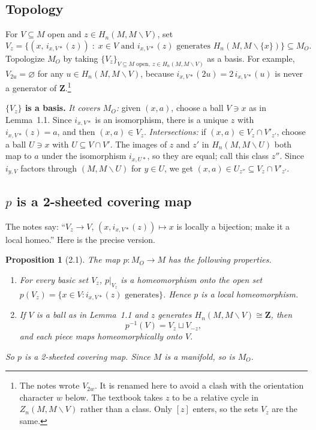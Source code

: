 \documentclass[11pt]{article}
\newcommand{\Z}{\mathbf{Z}}
\newcommand{\MO}{M_O}
\newcommand{\minus}{\smallsetminus}
\newcommand{\iso}{\cong}
\theoremstyle{namedit}
\newtheorem{prop}{Proposition}
\theoremstyle{namedrm}
\begin{document}
\subsection{Topology}
For $V\subseteq M$ open and $z\in H_n(M,M\minus V)$, set
\[
  V_z=\bigl\{(x,\,i_{x,V*}(z))\;:\;x\in V \text{ and } i_{x,V*}(z)\text{ generates }H_n(M,M\minus\{x\})\bigr\}
  \subseteq \MO .
\]
Topologize $\MO$ by taking $\{V_z\}_{V\subseteq M\text{ open},\ z\in H_n(M,M\minus V)}$ as a basis.
For example, $V_{2u}=\varnothing$ for any $u\in H_n(M,M\minus V)$, because $i_{x,V*}(2u)=2\,i_{x,V*}(u)$ is
never a generator of $\Z$.\footnote{The notes wrote $V_{2w}$. It is renamed here to avoid a clash with
the orientation character $w$ below. The textbook takes $z$ to be a relative cycle in
$Z_n(M,M\minus V)$ rather than a class. Only $[z]$ enters, so the sets $V_z$ are the same.}

\begin{filled}
\textbf{$\{V_z\}$ is a basis.}
\emph{It covers $\MO$:} given $(x,a)$, choose a ball $V\ni x$ as in Lemma~1.1. Since
$i_{x,V*}$ is an isomorphism, there is a unique $z$ with $i_{x,V*}(z)=a$, and then $(x,a)\in V_z$.
\emph{Intersections:} if $(x,a)\in V_z\cap V'_{z'}$, choose a ball $U\ni x$ with $U\subseteq V\cap V'$.
The images of $z$ and $z'$ in $H_n(M,M\minus U)$ both map to $a$ under the isomorphism $i_{x,U*}$, so
they are equal; call this class $z''$. Since $i_{y,V}$ factors through $(M,M\minus U)$ for $y\in U$, we
get $(x,a)\in U_{z''}\subseteq V_z\cap V'_{z'}$.
\end{filled}

\subsection{\texorpdfstring{$p$}{p} is a 2-sheeted covering map}
The notes say: ``$V_z\to V$, $(x,i_{x,V*}(z))\mapsto x$ is locally a bijection; make it a local homeo.''
Here is the precise version.

\begin{prop}[2.1]\label{prop:cover}
The map $p\colon\MO\to M$ has the following properties.
\begin{enumerate}[label=(\alph*)]
  \item For every basic set $V_z$, $p|_{V_z}$ is a homeomorphism onto the open set
        $p(V_z)=\{x\in V: i_{x,V*}(z)\text{ generates}\}$. Hence $p$ is a local homeomorphism.
  \item If $V$ is a ball as in Lemma~1.1 and $z$ generates $H_n(M,M\minus V)\iso\Z$, then
        \[ p^{-1}(V)=V_z\sqcup V_{-z}, \]
        and each piece maps homeomorphically onto $V$.
\end{enumerate}
So $p$ is a 2-sheeted covering map. Since $M$ is a manifold, so is $\MO$.
\end{prop}
\end{document}
